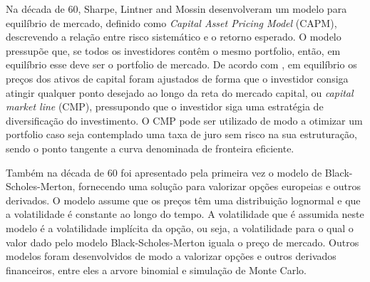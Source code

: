 \documentclass[
  12pt,
  a4paper,
  openany]{book}
\begin{document}
Na década de 60, Sharpe, Lintner and Mossin desenvolveram um modelo para equilíbrio de mercado, definido como \emph{Capital Asset Pricing Model} (CAPM), descrevendo a relação entre risco sistemático e o retorno esperado. O modelo pressupõe que, se todos os investidores contêm o mesmo portfolio, então, em equilíbrio esse deve ser o portfolio de mercado. De acordo com \citet{Sharpe1964}, em equilíbrio os preços dos ativos de capital foram ajustados de forma que o investidor consiga atingir qualquer ponto desejado ao longo da reta do mercado capital, ou \emph{capital market line} (CMP), pressupondo que o investidor siga uma estratégia de diversificação do investimento. O CMP pode ser utilizado de modo a otimizar um portfolio caso seja contemplado uma taxa de juro sem risco na sua estruturação, sendo o ponto tangente a curva denominada de fronteira eficiente.

Também na década de 60 foi apresentado pela primeira vez o modelo de Black-Scholes-Merton, fornecendo uma solução para valorizar opções europeias e outros derivados. O modelo assume que os preços têm uma distribuição lognormal e que a volatilidade é constante ao longo do tempo. A volatilidade que é assumida neste modelo é a volatilidade implícita da opção, ou seja, a volatilidade para o qual o valor dado pelo modelo Black-Scholes-Merton iguala o preço de mercado. Outros modelos foram desenvolvidos de modo a valorizar opções e outros derivados financeiros, entre eles a arvore binomial e simulação de Monte Carlo.
\end{document}
